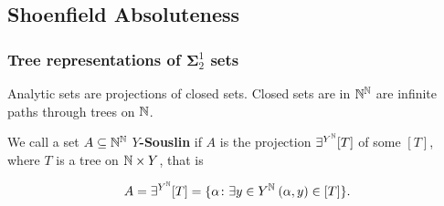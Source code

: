 \subsection{Shoenfield Absoluteness}

\subsubsection{Tree representations of $\mathbf{\Sigma}^1_2$ sets}

Analytic sets are projections of closed sets. Closed sets are in $\mathbb{N}^{\mathbb{N}}$ are infinite paths through trees on $\mathbb{N}$.

We call a set $A \subseteq \mathbb{N}^{\mathbb{N}}$ \textbf{$Y$-Souslin} if $A$ is the projection $\exists^{Y^{\mathbb{N}}}[T]$ of some $[T]$, where $T$ is a tree on $\mathbb{N} \times Y$, that is

\begin{equation}
A = \exists^{Y^{\mathbb{N}}}[T] = \{\alpha \colon \exists y \in Y^{\mathbb{N}} \: (\alpha,y) \in [T] \}.
\end{equation}

